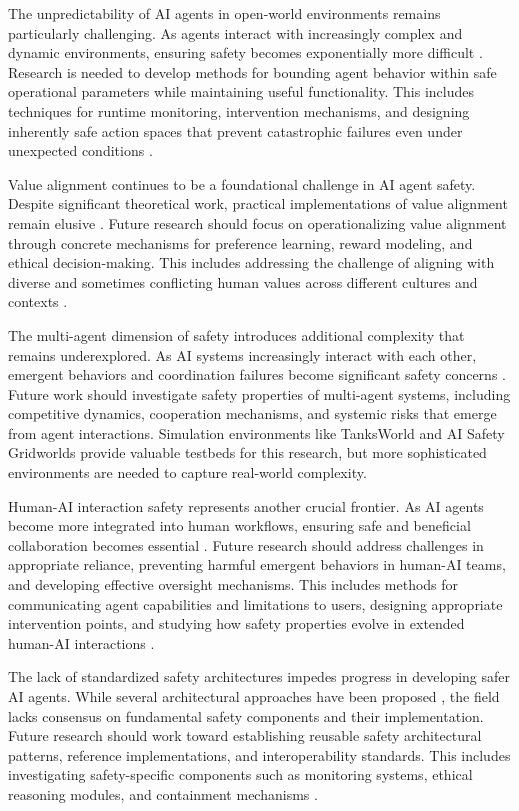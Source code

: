 \documentclass[conference]{IEEEtran}
\begin{document}
The unpredictability of AI agents in open-world environments remains particularly challenging. As agents interact with increasingly complex and dynamic environments, ensuring safety becomes exponentially more difficult \cite{2406.02630}. Research is needed to develop methods for bounding agent behavior within safe operational parameters while maintaining useful functionality. This includes techniques for runtime monitoring, intervention mechanisms, and designing inherently safe action spaces that prevent catastrophic failures even under unexpected conditions \cite{2409.03793}.

Value alignment continues to be a foundational challenge in AI agent safety. Despite significant theoretical work, practical implementations of value alignment remain elusive \cite{2002.05671}. Future research should focus on operationalizing value alignment through concrete mechanisms for preference learning, reward modeling, and ethical decision-making. This includes addressing the challenge of aligning with diverse and sometimes conflicting human values across different cultures and contexts \cite{2410.06946}.

The multi-agent dimension of safety introduces additional complexity that remains underexplored. As AI systems increasingly interact with each other, emergent behaviors and coordination failures become significant safety concerns \cite{2002.11174}. Future work should investigate safety properties of multi-agent systems, including competitive dynamics, cooperation mechanisms, and systemic risks that emerge from agent interactions. Simulation environments like TanksWorld \cite{2002.11174} and AI Safety Gridworlds \cite{1711.09883} provide valuable testbeds for this research, but more sophisticated environments are needed to capture real-world complexity.

Human-AI interaction safety represents another crucial frontier. As AI agents become more integrated into human workflows, ensuring safe and beneficial collaboration becomes essential \cite{2409.16427}. Future research should address challenges in appropriate reliance, preventing harmful emergent behaviors in human-AI teams, and developing effective oversight mechanisms. This includes methods for communicating agent capabilities and limitations to users, designing appropriate intervention points, and studying how safety properties evolve in extended human-AI interactions \cite{2405.09794}.

The lack of standardized safety architectures impedes progress in developing safer AI agents. While several architectural approaches have been proposed \cite{2408.12935}, the field lacks consensus on fundamental safety components and their implementation. Future research should work toward establishing reusable safety architectural patterns, reference implementations, and interoperability standards. This includes investigating safety-specific components such as monitoring systems, ethical reasoning modules, and containment mechanisms \cite{2502.16776}.
\end{document}
